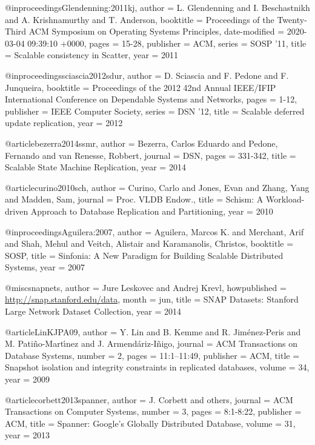 @inproceedings{Glendenning:2011kj,
  author        = {L. Glendenning and I. Beschastnikh and A. Krishnamurthy and T. Anderson},
  booktitle     = {Proceedings of the Twenty-Third ACM Symposium on Operating Systems Principles},
  date-modified = {2020-03-04 09:39:10 +0000},
  pages         = {15-28},
  publisher     = {ACM},
  series        = {SOSP '11},
  title         = {Scalable consistency in {Scatter}},
  year          = {2011}
}

@inproceedings{sciascia2012sdur,
  author    = {D. Sciascia and F. Pedone and F. Junqueira},
  booktitle = {Proceedings of the 2012 42nd Annual IEEE/IFIP International Conference on Dependable Systems and Networks},
  pages     = {1-12},
  publisher = {{IEEE} Computer Society},
  series    = {DSN '12},
  title     = {Scalable deferred update replication},
  year      = {2012}
}

@article{bezerra2014ssmr,
  author  = {Bezerra, Carlos Eduardo and Pedone, Fernando and van Renesse, Robbert},
  journal = {DSN},
  pages   = {331-342},
  title   = {Scalable State Machine Replication},
  year    = {2014}
}

@article{curino2010sch,
  author  = {Curino, Carlo and Jones, Evan and Zhang, Yang and Madden, Sam},
  journal = {Proc. VLDB Endow.},
  title   = {Schism: A Workload-driven Approach to Database Replication and Partitioning},
  year    = {2010}
}

@inproceedings{Aguilera:2007,
  author    = {Aguilera, Marcos K. and Merchant, Arif and Shah, Mehul and Veitch, Alistair and Karamanolis, Christos},
  booktitle = {SOSP},
  title     = {Sinfonia: A New Paradigm for Building Scalable Distributed Systems},
  year      = {2007}
}

@misc{snapnets,
  author       = {Jure Leskovec and Andrej Krevl},
  howpublished = {\url{http://snap.stanford.edu/data}},
  month        = jun,
  title        = {{SNAP Datasets}: {Stanford} Large Network Dataset Collection},
  year         = 2014
}

@article{LinKJPA09,
  author    = {Y. Lin and B. Kemme and R. Jim{\'e}nez-Peris and M. Pati{\~n}o-Mart\'{\i}nez and J. Armend{\'a}riz-I{\~n}igo},
  journal   = {ACM Transactions on Database Systems},
  number    = {2},
  pages     = {11:1--11:49},
  publisher = {ACM},
  title     = {Snapshot isolation and integrity constraints in replicated databases},
  volume    = {34},
  year      = {2009}
}

@article{corbett2013spanner,
  author    = {J. Corbett and others},
  journal   = {ACM Transactions on Computer Systems},
  number    = {3},
  pages     = {8:1-8:22},
  publisher = {ACM},
  title     = {Spanner: Google's Globally Distributed Database},
  volume    = {31},
  year      = {2013}
}


